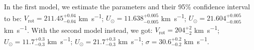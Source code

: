 In the first model, we estimate the parameters and their 95\% confidence interval to be: %
$V_{\text{rot}} = 211.45_{-0.04}^{+0.04}$ \unit{\kilo\meter\per\second};  
$U_{\odot} = 11.638_{-0.005}^{+0.005}$ \unit{\kilo\meter\per\second};  
$U_{\odot} = 21.604_{-0.005}^{+0.005}$ \unit{\kilo\meter\per\second}.  
With the second model instead, we got:  
$V_{\text{rot}} = 204_{-2}^{+2}$ \unit{\kilo\meter\per\second};  
$U_{\odot} = 11.7_{-0.3}^{+0.3}$ \unit{\kilo\meter\per\second};  
$U_{\odot} = 21.7_{-0.3}^{+0.3}$ \unit{\kilo\meter\per\second};  
$\sigma = 30.6_{-0.2}^{+0.2}$ \unit{\kilo\meter\per\second}.  

